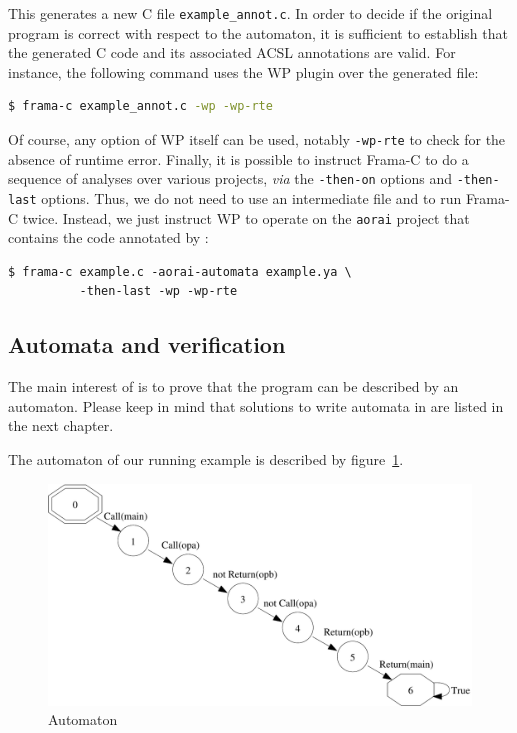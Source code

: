 \documentclass{report}
\begin{document}
This generates a new C file \texttt{example\_annot.c}.
In order to decide if the original program is correct with respect to
the automaton, it is sufficient to establish that the generated C code and
its associated ACSL annotations are valid. For instance, the following command
uses the WP plugin over the generated file:
\begin{lstlisting}[language=sh]
$ frama-c example_annot.c -wp -wp-rte
\end{lstlisting} %

Of course, any option of WP itself can be used, notably \texttt{-wp-rte} to
check for the absence of runtime error.
Finally, it is possible to instruct Frama-C to do a
sequence of analyses over various projects, {\it via} the \texttt{-then-on}
options and \texttt{-then-last} options.
Thus, we do not need to use an intermediate file and to run Frama-C
twice. Instead, we just instruct WP to operate on the \texttt{aorai}
project that contains the code annotated by \aorai:
\begin{lstlisting}
$ frama-c example.c -aorai-automata example.ya \
          -then-last -wp -wp-rte
\end{lstlisting} %

\subsection{Automata and verification}
The main interest of \aorai is to prove that the program can be
described by an automaton. Please keep in mind that solutions to
write automata in \aorai are listed in the next chapter.

 The automaton of our running example is described by
 figure~\ref{BuchiExample}.

  \begin{figure}[ht]
    \centerline{\includegraphics[width=350pt]{Schemas/example}}
    \caption{Automaton}
    \label{BuchiExample}
  \end{figure}
\end{document}
